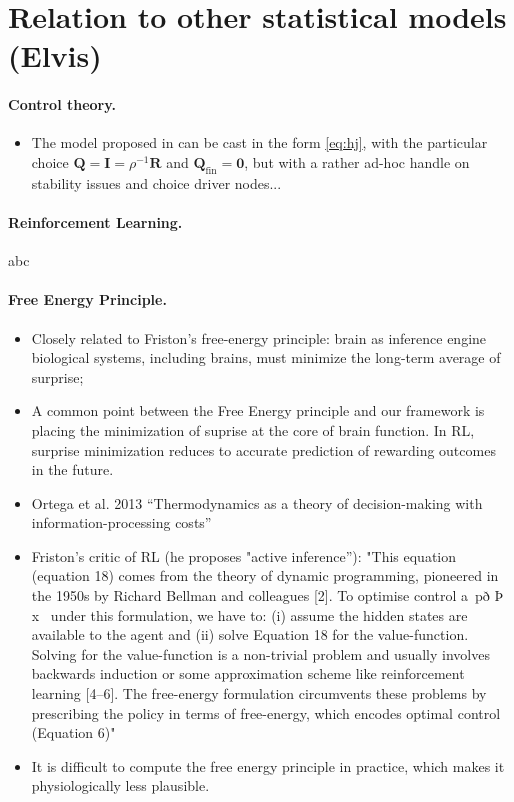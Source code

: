 \documentclass{article} %
\newcommand{\R}{\mathbb{R}}
\def\R{\mathbf{R}}
\def\Q{\mathbf{Q}}
\begin{document}
\section{Relation to other statistical models (Elvis)}
\paragraph{Control theory.}
\begin{itemize}
  \item The model proposed in \cite{betzel2016} can be cast in the form \eqref{eq:hj}, with the particular choice $\Q = \textbf{I} = \rho^{-1}\R$ and $\Q_{\text{fin}} = \textbf{0}$, but with a rather ad-hoc handle on stability issues and choice driver nodes...
\end{itemize}

\paragraph{Reinforcement Learning.}
abc

\paragraph{Free Energy Principle.}
\begin{itemize}
  \item Closely related to Friston's free-energy principle: brain as inference engine
  biological systems, including brains, must minimize the long-term average of surprise;
  \item A common point between the Free Energy principle and our framework
  is placing the minimization of suprise at the core of brain function.
  In RL, surprise minimization reduces to accurate prediction of 
  rewarding outcomes in the future.
  \item Ortega et al. 2013 \cite{ortega2013thermodynamics} ``Thermodynamics as a theory of decision-making with information-processing costs''
\item Friston's critic of RL \cite{fristonAIorRL} (he proposes "active inference''): "This equation (equation 18) comes from the theory of dynamic programming,
pioneered in the 1950s by Richard Bellman and colleagues [2]. To
optimise control a~pð Þ x~ under this formulation, we have to: (i)
assume the hidden states are available to the agent and (ii) solve
Equation 18 for the value-function. Solving for the value-function
is a non-trivial problem and usually involves backwards induction
or some approximation scheme like reinforcement learning [4–6].
The free-energy formulation circumvents these problems by
prescribing the policy in terms of free-energy, which encodes
optimal control (Equation 6)"
\item It is difficult to compute the free energy principle
in practice, which makes it physiologically less plausible.
  \end{itemize}
\end{document}
